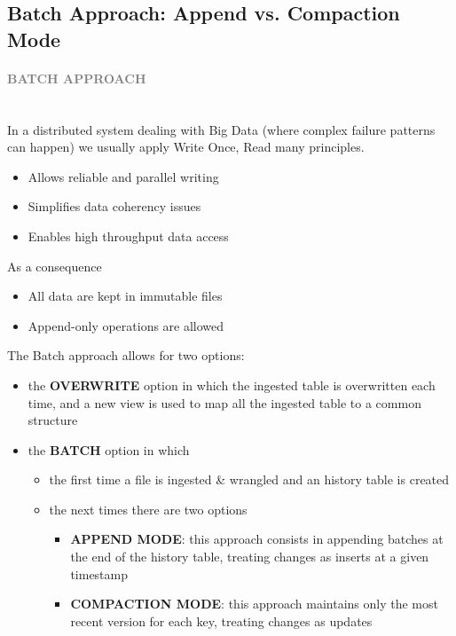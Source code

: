 \documentclass[10pt,a4paper]{article}
\newcommand{\myparagraph}[1]{\paragraph{\normalsize{\textcolor{gray}{\uppercase{\textbf{#1}}}} }\mbox{} \vspace{0.5em}\\}
\begin{document}
 \subsection{Batch Approach: Append vs. Compaction Mode}
 \myparagraph{Batch Approach}
 In a distributed system dealing with Big Data (where complex failure patterns can happen) we usually apply Write Once, Read many principles.
 \begin{itemize}
 	\item Allows reliable and parallel writing
 	\item Simplifies data coherency issues
 	\item Enables high throughput data access

 \end{itemize}
 As a consequence
\begin{itemize}
	\item All data are kept in immutable files
	\item Append-only operations are allowed
\end{itemize}
\pagebreak
The Batch approach allows for two options:
\begin{itemize}
	\item the \textbf{OVERWRITE} option in which the ingested table is overwritten each time, and a new view is used to map all the ingested table to a common structure
	\item the \textbf{BATCH} option in which 
	\begin{itemize}
	\item the first time a file is ingested \& wrangled and an history table is created
	\item the next times there are two options
	\begin{itemize}
			\item \textbf{APPEND MODE}: this approach consists in appending batches at the end of the history table, treating changes as inserts at a given timestamp
		\item \textbf{COMPACTION MODE}: this approach maintains only the most recent version for each key, treating changes as updates
		\end{itemize}
\end{itemize}
\end{itemize}
\end{document}
